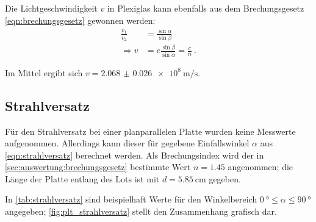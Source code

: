 Die Lichtgeschwindigkeit $v$ in Plexiglas kann ebenfalls
aus dem Brechungsgesetz \eqref{eqn:brechungsgesetz} gewonnen werden:
\begin{align*}
  \frac{v_1}{v_2} &= \frac{\sin\alpha}{\sin\beta}
  \tag{$v_1 =: c; v_2 =: v$} \\
  \Rightarrow
  v &= c \frac{\sin\beta}{\sin\alpha}
  = \frac{c}{n} \ .
\end{align*}

Im Mittel ergibt sich $v = \SI{2.068(26)e8}{\meter\per\second}$.


\FloatBarrier %
\subsection{Strahlversatz}
\label{sec:auswertung:strahlversatz}
Für den Strahlversatz bei einer planparallelen Platte
wurden keine Messwerte aufgenommen.
Allerdings kann dieser für gegebene Einfallswinkel $\alpha$
aus \eqref{eqn:strahlversatz} berechnet werden.
Als Brechungsindex wird der
in \autoref{sec:auswertung:brechungsgesetz} bestimmte Wert $n = \num{1.45}$ angenommen;
die Länge der Platte entlang des Lots ist mit $d = \SI{5.85}{\centi\meter}$ gegeben.

In \autoref{tab:strahlversatz} sind beispielhaft Werte
für den Winkelbereich $\SI{0}{\degree} \leq \alpha \leq \SI{90}{\degree}$
angegeben;
\autoref{fig:plt_strahlversatz} stellt den Zusammenhang grafisch dar.

